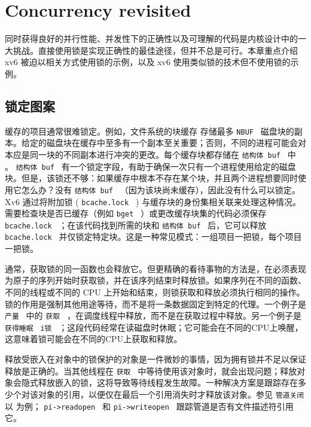 \documentclass[UTF8]{article}
\begin{document}
   \chapter{Concurrency revisited}   
    \label{CH:LOCK2}     

同时获得良好的并行性能、并发性下的正确性以及可理解的代码是内核设计中的一大挑战。直接使用锁是实现正确性的最佳途径，但并不总是可行。本章重点介绍 xv6 被迫以相关方式使用锁的示例，以及 xv6 使用类似锁的技术但不使用锁的示例。  

   \section{锁定图案  }     

缓存的项目通常很难锁定。例如，文件系统的块缓存        存储最多  {    \tt    NBUF   }  磁盘块的副本。给定的磁盘块在缓存中至多有一个副本至关重要；否则，不同的进程可能会对本应是同一块的不同副本进行冲突的更改。每个缓存块都存储在  {    \tt    结构体 buf   }  中
        。  {    \tt    结构体 buf   }  有一个锁定字段，有助于确保一次只有一个进程使用给定的磁盘块。但是，该锁还不够：如果缓存中根本不存在某个块，并且两个进程想要同时使用它怎么办？没有  {    \tt    结构体 buf   } （因为该块尚未缓存），因此没有什么可以锁定。 Xv6 通过将附加锁 (  {    \tt    bcache.lock   }  ) 与缓存块的身份集相关联来处理这种情况。需要检查块是否已缓存（例如  {    \tt    bget   }         ）或更改缓存块集的代码必须保存  {    \tt    bcache.lock   }  ；在该代码找到所需的块和  {    \tt    结构体 buf   }  后，它可以释放  {    \tt    bcache.lock   }  并仅锁定特定块。这是一种常见模式：一组项目一把锁，每个项目一把锁。  

通常，获取锁的同一函数也会释放它。但更精确的看待事物的方法是，在必须表现为原子的序列开始时获取锁，并在该序列结束时释放锁。如果序列在不同的函数、不同的线程或不同的 CPU 上开始和结束，则锁获取和释放必须执行相同的操作。锁的作用是强制其他用途等待，而不是将一条数据固定到特定的代理。一个例子是  {    \tt    产量   }  中的  {    \tt    获取   } 
        ，在调度线程中释放，而不是在获取过程中释放。另一个例子是
  {    \tt    获得睡眠   }   {    \tt    i锁   }         ；这段代码经常在读磁盘时休眠；它可能会在不同的CPU上唤醒，这意味着锁可能会在不同的CPU上获取和释放。  

释放受嵌入在对象中的锁保护的对象是一件微妙的事情，因为拥有锁并不足以保证释放是正确的。当其他线程在  {    \tt    获取   }  中等待使用该对象时，就会出现问题；释放对象会隐式释放嵌入的锁，这将导致等待线程发生故障。一种解决方案是跟踪存在多少个对该对象的引用，以便仅在最后一个引用消失时才释放该对象。参见  {    \tt    管道关闭   } 
 以        为例；
  {    \tt    pi->readopen   }  和  {    \tt    pi->writeopen   }  跟踪管道是否有文件描述符引用它。  
\end{document}
